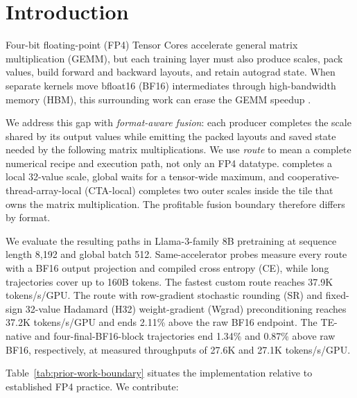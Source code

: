 \section{Introduction}

Four-bit floating-point (FP4) Tensor Cores accelerate general matrix
multiplication (GEMM), but each training layer must also produce scales, pack
values, build forward and backward layouts, and retain autograd state. When
separate kernels move bfloat16 (BF16) intermediates through high-bandwidth
memory (HBM), this surrounding work can erase the GEMM speedup
\cite{nvidia2025nvfp4}.

We address this gap with \emph{format-aware fusion}: each producer completes
the scale shared by its output values while emitting the packed layouts and
saved state needed by the following matrix multiplications. We use
\emph{route} to mean a complete numerical recipe and execution path, not only
an FP4 datatype. \mxfp{} completes a local 32-value scale, global
\nvfp{} waits for a tensor-wide maximum, and cooperative-thread-array-local
(CTA-local) \nvfp{} completes two outer scales inside the tile that owns the
matrix multiplication. The profitable fusion boundary therefore differs by
format.

We evaluate the resulting paths in Llama-3-family 8B pretraining at sequence length
8,192 and global batch 512. Same-accelerator probes measure every route with a
BF16 output projection and compiled cross entropy (CE), while long
trajectories cover up to 160B tokens. The fastest custom route reaches 37.9K
tokens/s/GPU. The \mxfp{} route with row-gradient stochastic rounding (SR)
and fixed-sign 32-value Hadamard (H32) weight-gradient (Wgrad)
preconditioning reaches 37.2K
tokens/s/GPU and ends 2.11\% above the raw BF16 endpoint. The TE-native and
four-final-BF16-block trajectories end 1.34\% and 0.87\% above raw BF16,
respectively, at measured throughputs of 27.6K and 27.1K tokens/s/GPU.

Table~\ref{tab:prior-work-boundary} situates the implementation relative to
established FP4 practice. We contribute:

